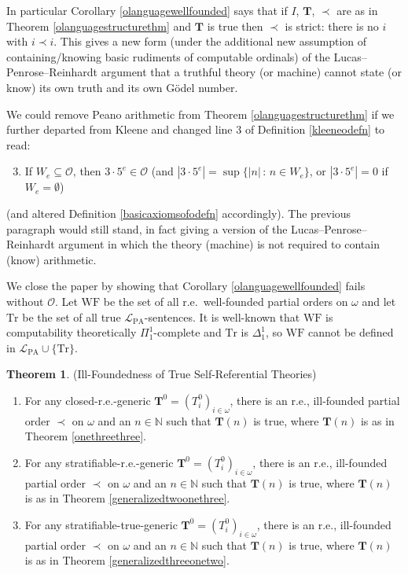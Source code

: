\documentclass[reqno]{article}
\theoremstyle{definition}
\newtheorem{theorem}{Theorem}
\def\N{\mathbb{N}}
\def\L{\mathscr{L}}
\def\T{\mathbf{T}}
\def\O{\mathcal{O}}
\def\LPA{\L_{\mathrm{PA}}}
\def\Tr{\mathrm{Tr}}
\begin{document}
%
%

In particular
Corollary \ref{olanguagewellfounded} says that
if $I$, $\T$, $\prec$ are as in Theorem \ref{olanguagestructurethm} and $\T$ is true
then $\prec$ is strict: there is no $i$ with $i\prec i$.
This gives a new form
(under the additional new assumption of containing/knowing basic rudiments of computable ordinals)
of the Lucas--Penrose--Reinhardt argument that a truthful theory (or machine)
cannot state (or know) its own truth and its own G\"odel number.

We could remove Peano arithmetic from Theorem \ref{olanguagestructurethm}
if we further departed from Kleene and changed line 3 of Definition 
\ref{kleeneodefn} to read:
\begin{enumerate}
\setcounter{enumi}{2}
\item If $W_e\subseteq\O$, then $3\cdot 5^e\in\O$ (and 
$|3\cdot 5^e|=\sup\{|n|\,:\,n\in W_e\}$, or $|3\cdot 5^e|=0$
if $W_e=\emptyset$)
\end{enumerate}
(and altered Definition \ref{basicaxiomsofodefn} accordingly).
The previous paragraph would still stand, in fact giving a version
of the Lucas--Penrose--Reinhardt argument in which the theory (machine)
is not required to contain (know) arithmetic.


We close the paper by showing that Corollary \ref{olanguagewellfounded}
fails without $\O$.  Let $\mathrm{WF}$ be the set
of all r.e.~well-founded partial orders on $\omega$
and let $\Tr$ be the set of all
true $\LPA$-sentences.
It is well-known that $\mathrm{WF}$ is computability theoretically
$\Pi^1_1$-complete and $\Tr$ is $\Delta^1_1$, so
$\mathrm{WF}$ cannot be defined
in $\LPA\cup\{\Tr\}$.

\begin{theorem}
(Ill-Foundedness of True Self-Referential Theories)
\begin{enumerate}
\item
For any closed-r.e.-generic $\T^0=(T^0_i)_{i\in\omega}$,
there is an r.e., ill-founded partial order $\prec$ on $\omega$
and an $n\in\N$
such that $\T(n)$ is true,
where $\T(n)$ is as in Theorem \ref{onethreethree}.
\item
For any stratifiable-r.e.-generic $\T^0=(T^0_i)_{i\in\omega}$, there is an 
r.e., ill-founded partial order $\prec$ on $\omega$ and an $n\in\N$ such that
$\T(n)$ is true, where $\T(n)$ is as in Theorem \ref{generalizedtwoonethree}.
\item
For any stratifiable-true-generic $\T^0=(T^0_i)_{i\in\omega}$, there is an r.e., ill-founded partial order
$\prec$ on $\omega$ and an $n\in\N$ such that
$\T(n)$ is true, where $\T(n)$ is as in Theorem \ref{generalizedthreeonetwo}.
\end{enumerate}
\end{theorem}
\end{document}
